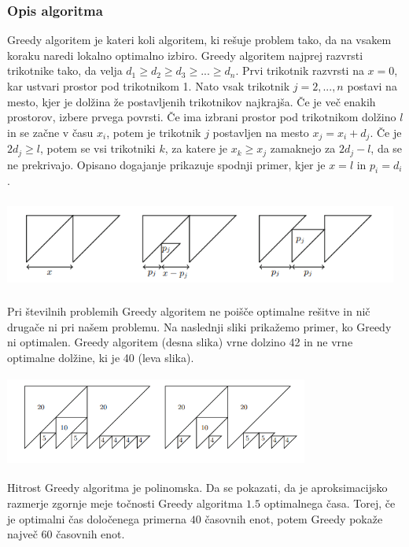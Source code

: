 \documentclass[a4paper,12pt]{article}
\theoremstyle{definition}
\theoremstyle{plain}
\begin{document}
\subsubsection{Opis algoritma}
Greedy algoritem je kateri koli algoritem, ki rešuje problem tako, da na vsakem koraku naredi lokalno optimalno izbiro.
Greedy algoritem najprej razvrsti trikotnike tako, da velja 
$d_1 \geq d_2 \geq d_3 \geq ... \geq d_n$. Prvi trikotnik razvrsti na $x=0$, kar ustvari prostor pod trikotnikom 1.
Nato vsak trikotnik $j=2,...,n$ postavi na mesto, kjer je dolžina že postavljenih trikotnikov najkrajša. Če je več enakih prostorov, izbere prvega povrsti.
Če ima izbrani prostor pod trikotnikom dolžino $l$ in se začne v času $x_i$, potem je trikotnik $j$ postavljen na mesto $x_j=x_i+d_j$. Če je $2d_j \ge l$,  potem se vsi trikotniki $k$, za katere je $x_k \ge x_j$ zamaknejo za $ 2d_j-l$, da se ne prekrivajo. Opisano 
dogajanje prikazuje spodnji primer, kjer je $x=l$ in $ p_i = d_i $.
\begin{center}
    \includegraphics[width=13cm, height=3cm]{greedy.png} 
 \end{center}
Pri številnih problemih Greedy algoritem ne poišče optimalne rešitve in nič drugače ni pri našem problemu.
Na naslednji sliki prikažemo primer, ko Greedy ni optimalen. Greedy algoritem (desna slika) vrne dolzino 42 in ne vrne optimalne dolžine, ki je 40 (leva slika).
\begin{center}
    \includegraphics[width=10cm, height=3cm]{primer_neoptimalnosti_greedy.png} 
 \end{center}
Hitrost Greedy algoritma je polinomska. Da se pokazati, da je aproksimacijsko razmerje zgornje meje točnosti Greedy algoritma $1.5$ optimalnega časa. Torej, če je optimalni čas določenega primerna
$40$ časovnih enot, potem Greedy pokaže največ $60$ časovnih enot.
\end{document}
